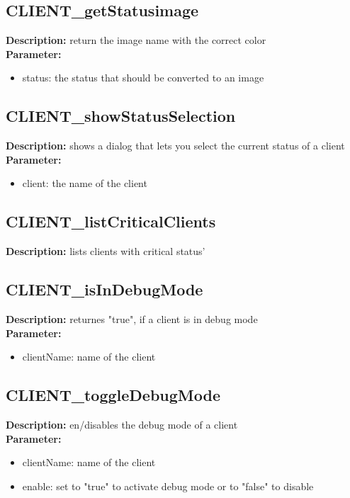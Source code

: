 \subsection{CLIENT\_getStatusimage}
\textbf{Description:} return the image name with the correct color\\
\textbf{Parameter:}
\begin{itemize}
\item status: the status that should be converted to an image
\end{itemize}

\subsection{CLIENT\_showStatusSelection}
\textbf{Description:} shows a dialog that lets you select the current status of a client\\
\textbf{Parameter:}
\begin{itemize}
\item client: the name of the client
\end{itemize}

\subsection{CLIENT\_listCriticalClients}
\textbf{Description:} lists clients with critical status'\\

\subsection{CLIENT\_isInDebugMode}
\textbf{Description:} returnes "true", if a client is in debug mode\\
\textbf{Parameter:}
\begin{itemize}
\item clientName: name of the client
\end{itemize}

\subsection{CLIENT\_toggleDebugMode}
\textbf{Description:} en/disables the debug mode of a client\\
\textbf{Parameter:}
\begin{itemize}
\item clientName: name of the client
\item enable: set to "true" to activate debug mode or to "false" to disable
\end{itemize}

